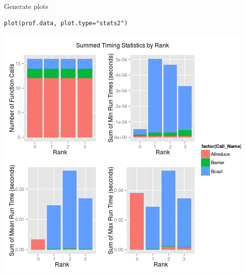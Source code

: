 \begin{frame}[fragile]
  \begin{block}{Generate plots}
  \begin{center}\vspace{-.6cm}
\begin{lstlisting}
plot(prof.data, plot.type="stats2")
\end{lstlisting}\vspace{-.2cm}
\includegraphics[scale=.39]{../common/pics/prof/stats2.png}
\end{center}
  \end{block}
\end{frame}


